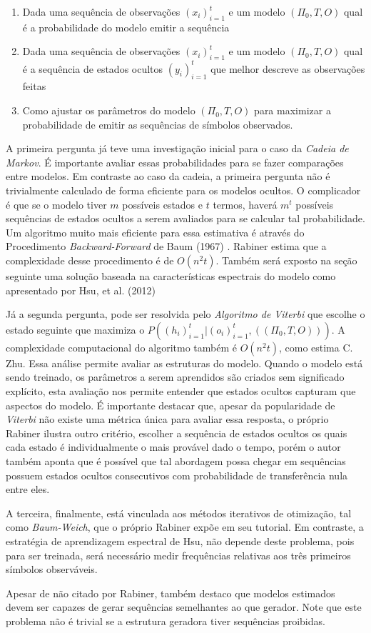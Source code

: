 \documentclass{subfiles}
\begin{document}
\begin{enumerate}
    \item Dada uma sequência de observações $(x_i)_{i=1}^t$ e um modelo $(\Pi_0, T, O)$ qual é a probabilidade do modelo emitir a sequência
    \item Dada uma sequência de observações $(x_i)_{i=1}^t$ e um modelo $(\Pi_0, T, O)$ qual é a sequência de estados ocultos $(y_i)_{i=1}^t$ que melhor descreve as observações feitas
    \item Como ajustar os parâmetros do modelo $(\Pi_0, T, O)$ para maximizar a probabilidade de emitir as sequências de símbolos observados.
\end{enumerate}
A primeira pergunta já teve uma investigação inicial para o caso da \textit{Cadeia de Markov}. É importante avaliar essas probabilidades para se fazer comparações entre modelos. Em contraste ao caso da cadeia, a primeira pergunta não é trivialmente calculado de forma eficiente para os modelos ocultos. O complicador é que se o modelo tiver $m$ possíveis estados e $t$ termos, haverá $m^t$ possíveis sequências de estados ocultos a serem avaliados para se calcular tal probabilidade. Um algoritmo muito mais eficiente para essa estimativa é através do Procedimento \textit{Backward-Forward} de Baum (1967) \autocite{Baum:1967AnIW}. Rabiner estima que a complexidade desse procedimento é de $O(n^2t)$. Também será exposto na seção seguinte uma solução baseada na características espectrais do modelo como apresentado por Hsu, et al. (2012) \autocite{Hsu:20121460}

Já a segunda pergunta, pode ser resolvida pelo \textit{Algoritmo de Viterbi} \autocite{Viterbi:1967EBFC} que escolhe o estado seguinte que maximiza o $P((h_i)_{i=1}^t \vert (o_i)_{i=1}^t, ((\Pi_0, T, O)))$. A complexidade computacional do algoritmo também é $O(n^2t)$, como estima C. Zhu\autocite{ZHU:202127}. Essa análise permite avaliar as estruturas do modelo. Quando o modelo está sendo treinado, os parâmetros a serem aprendidos são criados sem significado explícito, esta avaliação nos permite entender que estados ocultos capturam que aspectos do modelo. É importante destacar que, apesar da popularidade de \textit{Viterbi} não existe uma métrica única para avaliar essa resposta, o próprio Rabiner \autocite{Rabiner:1989tut} ilustra outro critério, escolher a sequência de estados ocultos os quais cada estado é individualmente o mais provável dado o tempo, porém o autor também aponta que é possível que tal abordagem possa chegar em sequências possuem estados ocultos consecutivos com probabilidade de transferência nula entre eles.

A terceira, finalmente, está vinculada aos métodos iterativos de otimização, tal como \textit{Baum-Weich}\autocite{Baum:1977tb01600}, que o próprio Rabiner expõe em seu tutorial\autocite{Rabiner:1989tut}. Em contraste, a estratégia de aprendizagem espectral de Hsu, não depende deste problema, pois para ser treinada, será necessário medir frequências relativas aos três primeiros símbolos observáveis.

Apesar de não citado por Rabiner, também destaco que modelos estimados devem ser capazes de gerar sequências semelhantes ao que gerador. Note que este problema não é trivial se a estrutura geradora tiver sequências proibidas.
\end{document}
